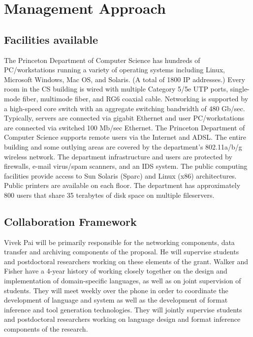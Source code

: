 \documentclass[12pt]{article}
\begin{document}
\newpage
\section{Management Approach}

\subsection{Facilities available}

The Princeton Department of Computer Science has hundreds of
PC/workstations running a variety of operating systems including
Linux, Microsoft Windows, Mac OS, and Solaris. (A total of 1800 IP
addresses.) Every room in the CS building is wired with multiple
Category 5/5e UTP ports, single-mode fiber, multimode fiber, and RG6
coaxial cable. Networking is supported by a high-speed core switch
with an aggregate switching bandwidth of 480 Gb/sec. Typically,
servers are connected via gigabit Ethernet and user PC/workstations
are connected via switched 100 Mb/sec Ethernet. The Princeton
Department of Computer Science supports remote users via the Internet
and ADSL. The entire building and some outlying areas are covered by
the department's 802.11a/b/g wireless network. The department
infrastructure and users are protected by firewalls, e-mail virus/spam
scanners, and an IDS system. The public computing facilities provide
access to Sun Solaris (Sparc) and Linux (x86) architectures. Public
printers are available on each floor. The department has approximately
800 users that share 35 terabytes of disk space on multiple
fileservers.

\subsection{Collaboration Framework}

Vivek Pai will be primarily responsible for the networking components,
data transfer and archiving components of the proposal.  He will
supervise students and postdoctoral researchers working on these
elements of the grant.  Walker and Fisher
have a 4-year history of working closely together on the design
and implementation of domain-specific languages, as well as on joint
supervision of students.  They will meet weekly over the phone
in order to coordinate the development of \pads{} language and system
as well as the development of format inference and tool generation 
technologies.  They will jointly supervise students and postdoctoral
researchers working on language design and format inference components
of the research.
\end{document}

